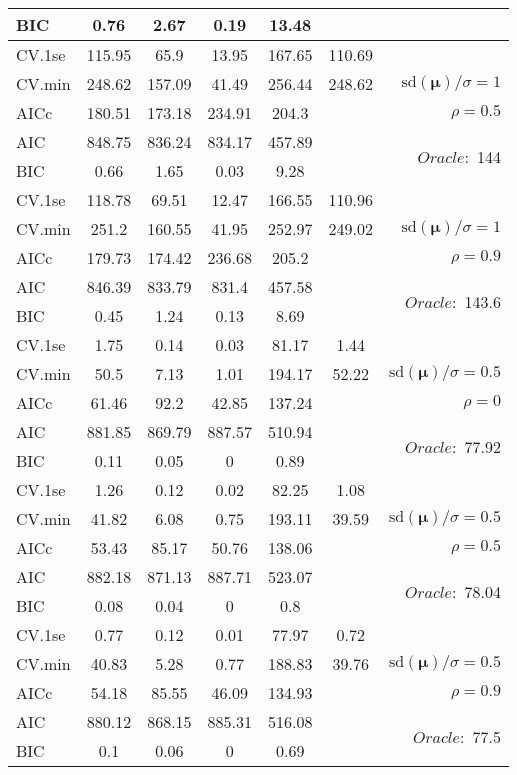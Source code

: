\begin{table}
\begin{center}
\begin{tabular}{l*{5}{c}|r}
BIC & 0.76 & 2.67 & 0.19 & 13.48 & &  \\
 \hline 
CV.1se & 115.95 & 65.9 & 13.95 & 167.65 & 110.69 & \\
CV.min & 248.62 & 157.09 & 41.49 & 256.44 & 248.62 &  $\mathrm{sd}(\mathbf{\mu})/\sigma=1$ \\
AICc & 180.51 & 173.18 & 234.91 & 204.3 & & $\rho=0.5$ \\
AIC & 848.75 & 836.24 & 834.17 & 457.89 & &  \multirow{2}{*}{$Oracle: $ 144} \\
BIC & 0.66 & 1.65 & 0.03 & 9.28 & &  \\
 \hline 
CV.1se & 118.78 & 69.51 & 12.47 & 166.55 & 110.96 & \\
CV.min & 251.2 & 160.55 & 41.95 & 252.97 & 249.02 &  $\mathrm{sd}(\mathbf{\mu})/\sigma=1$ \\
AICc & 179.73 & 174.42 & 236.68 & 205.2 & & $\rho=0.9$ \\
AIC & 846.39 & 833.79 & 831.4 & 457.58 & &  \multirow{2}{*}{$Oracle: $ 143.6} \\
BIC & 0.45 & 1.24 & 0.13 & 8.69 & &  \\
 \hline 
CV.1se & 1.75 & 0.14 & 0.03 & 81.17 & 1.44 & \\
CV.min & 50.5 & 7.13 & 1.01 & 194.17 & 52.22 &  $\mathrm{sd}(\mathbf{\mu})/\sigma=0.5$ \\
AICc & 61.46 & 92.2 & 42.85 & 137.24 & & $\rho=0$ \\
AIC & 881.85 & 869.79 & 887.57 & 510.94 & &  \multirow{2}{*}{$Oracle: $ 77.92} \\
BIC & 0.11 & 0.05 & 0 & 0.89 & &  \\
 \hline 
CV.1se & 1.26 & 0.12 & 0.02 & 82.25 & 1.08 & \\
CV.min & 41.82 & 6.08 & 0.75 & 193.11 & 39.59 &  $\mathrm{sd}(\mathbf{\mu})/\sigma=0.5$ \\
AICc & 53.43 & 85.17 & 50.76 & 138.06 & & $\rho=0.5$ \\
AIC & 882.18 & 871.13 & 887.71 & 523.07 & &  \multirow{2}{*}{$Oracle: $ 78.04} \\
BIC & 0.08 & 0.04 & 0 & 0.8 & &  \\
 \hline 
CV.1se & 0.77 & 0.12 & 0.01 & 77.97 & 0.72 & \\
CV.min & 40.83 & 5.28 & 0.77 & 188.83 & 39.76 &  $\mathrm{sd}(\mathbf{\mu})/\sigma=0.5$ \\
AICc & 54.18 & 85.55 & 46.09 & 134.93 & & $\rho=0.9$ \\
AIC & 880.12 & 868.15 & 885.31 & 516.08 & &  \multirow{2}{*}{$Oracle: $ 77.5} \\
BIC & 0.1 & 0.06 & 0 & 0.69 & &  \\
 \hline 
\end{tabular}
\end{center}
\vspace{-1cm}
\end{table}





